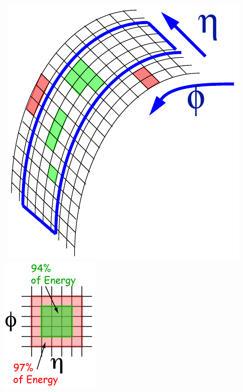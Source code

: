 \begin{center}
\centering
\mbox{
\includegraphics[scale=0.5]{THESISPLOTS/ECAL_CLustering.png}\quad
\includegraphics[scale=0.8]{THESISPLOTS/BasicCluster.png}}
 \label{fig:CLUSTER}
\end{center}

